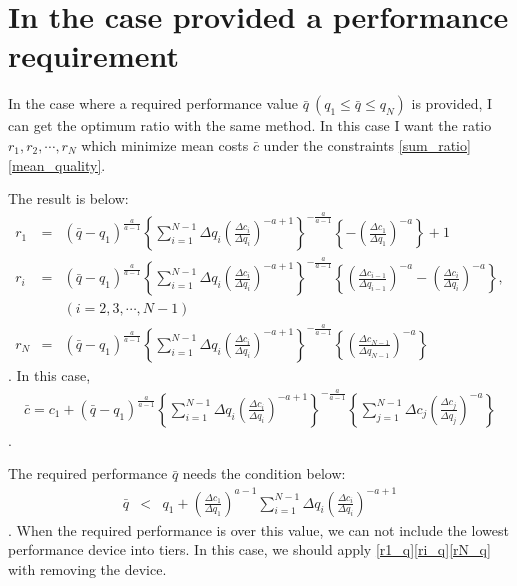 \documentclass[a4paper,11pt]{article}
\begin{document}
\appendix

\section{In the case provided a performance requirement}

In the case where a required performance value $\bar{q}\ (q_1 \leq \bar{q} \leq q_N)$ is provided, I can get the optimum ratio with the same method.
In this case I want the ratio $r_1,r_2,\cdots,r_N$ which minimize mean costs $\bar{c}$ under the constraints \eqref{sum_ratio}\eqref{mean_quality}.

The result is below:
\begin{eqnarray}
r_1 &=& \left(\bar{q}-q_1\right)^\frac{a}{a-1}
\left\{\sum_{i=1}^{N-1}\Delta q_i\left(\frac{\Delta c_i}{\Delta
				q_i}\right)^{-a+1}\right\}^{-\frac{a}{a-1}}
\left\{-\left(\frac{\Delta c_1}{\Delta q_1}\right)^{-a}\right\} +
1 \label{r1_q} \\
r_i &=& \left(\bar{q}-q_1\right)^\frac{a}{a-1}
\left\{\sum_{i=1}^{N-1}\Delta q_i\left(\frac{\Delta c_i}{\Delta
				q_i}\right)^{-a+1}\right\}^{-\frac{a}{a-1}}
\left\{\left(\frac{\Delta c_{i-1}}{\Delta q_{i-1}}\right)^{-a}
-\left(\frac{\Delta c_i}{\Delta q_i}\right)^{-a}\right\}
, \nonumber \\
&& (i = 2, 3, \cdots, N-1) \label{ri_q}\\
r_N &=& \left(\bar{q}-q_1\right)^\frac{a}{a-1}
\left\{\sum_{i=1}^{N-1}\Delta q_i\left(\frac{\Delta c_i}{\Delta
				q_i}\right)^{-a+1}\right\}^{-\frac{a}{a-1}}
\left\{\left(\frac{\Delta c_{N-1}}{\Delta
	q_{N-1}}\right)^{-a}\right\}
\label{rN_q}
\end{eqnarray}
. In this case,
\begin{eqnarray}
\bar{c} = c_1 + \left(\bar{q}-q_1\right)^\frac{a}{a-1}
\left\{\sum_{i=1}^{N-1}\Delta q_i\left(\frac{\Delta c_i}{\Delta
				q_i}\right)^{-a+1}\right\}^{-\frac{a}{a-1}}
\left\{\sum_{j=1}^{N-1}\Delta c_j \left(\frac{\Delta c_{j}}{\Delta q_{j}}\right)^{-a}\right\}
\end{eqnarray}
.

The required performance $\bar{q}$ needs the condition below:
\begin{eqnarray}
\bar{q} &<& q_1 + 
\left(\frac{\Delta c_1}{\Delta q_1}\right)^{a-1}
\sum_{i=1}^{N-1}\Delta q_i\left(\frac{\Delta c_i}{\Delta
				q_i}\right)^{-a+1} 
\end{eqnarray}
. When the required performance is over this value, we can not include the lowest performance device into tiers.
In this case, we should apply \eqref{r1_q}\eqref{ri_q}\eqref{rN_q} with removing the device.
\end{document}
